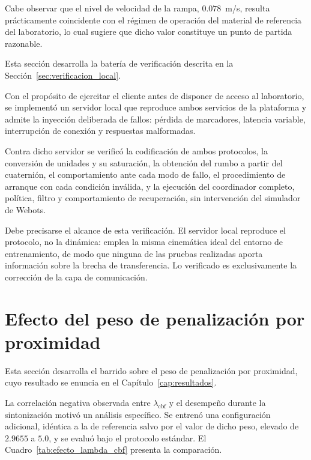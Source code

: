 Cabe observar que el nivel de velocidad de la rampa, $0{.}078$~m/s, resulta
prácticamente coincidente con el régimen de operación del material de
referencia del laboratorio, lo cual sugiere que dicho valor constituye un
punto de partida razonable.


Esta sección desarrolla la batería de verificación descrita en la
Sección~\ref{sec:verificacion_local}.

Con el propósito de ejercitar el cliente antes de disponer de acceso al
laboratorio, se implementó un servidor local que reproduce ambos servicios de
la plataforma y admite la inyección deliberada de fallos: pérdida de
marcadores, latencia variable, interrupción de conexión y respuestas
malformadas.

Contra dicho servidor se verificó la codificación de ambos protocolos, la
conversión de unidades y su saturación, la obtención del rumbo a partir del
cuaternión, el comportamiento ante cada modo de fallo, el procedimiento de
arranque con cada condición inválida, y la ejecución del coordinador completo, política, filtro y comportamiento de recuperación, sin intervención del
simulador de Webots.

Debe precisarse el alcance de esta verificación. El servidor local reproduce
el protocolo, no la dinámica: emplea la misma cinemática ideal del entorno de
entrenamiento, de modo que ninguna de las pruebas realizadas aporta
información sobre la brecha de transferencia. Lo verificado es exclusivamente
la corrección de la capa de comunicación.

\section{Efecto del peso de penalización por proximidad}
\label{anx:lambda_cbf}

Esta sección desarrolla el barrido sobre el peso de penalización por
proximidad, cuyo resultado se enuncia en el Capítulo~\ref{cap:resultados}.

 
La correlación negativa observada entre $\lambda_{\text{cbf}}$ y el desempeño
durante la sintonización motivó un análisis específico. Se entrenó una configuración adicional, idéntica a la de referencia salvo por
el valor de dicho peso, elevado de $2{.}9655$ a $5{.}0$, y se evaluó bajo el
protocolo estándar. El Cuadro~\ref{tab:efecto_lambda_cbf} presenta la
comparación.
 
